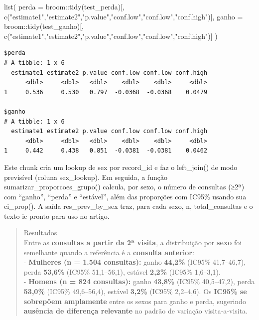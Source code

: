 \documentclass[
]{article}
\newenvironment{Shaded}{\begin{snugshade}}{\end{snugshade}}
\newcommand{\AttributeTok}[1]{\textcolor[rgb]{0.40,0.45,0.13}{#1}}
\newcommand{\FunctionTok}[1]{\textcolor[rgb]{0.28,0.35,0.67}{#1}}
\newcommand{\NormalTok}[1]{\textcolor[rgb]{0.00,0.23,0.31}{#1}}
\newcommand{\SpecialCharTok}[1]{\textcolor[rgb]{0.37,0.37,0.37}{#1}}
\newcommand{\StringTok}[1]{\textcolor[rgb]{0.13,0.47,0.30}{#1}}
\begin{document}
\begin{Shaded}
\begin{Highlighting}[]
\FunctionTok{list}\NormalTok{(}
  \AttributeTok{perda =}\NormalTok{ broom}\SpecialCharTok{::}\FunctionTok{tidy}\NormalTok{(test\_perda)[, }\FunctionTok{c}\NormalTok{(}\StringTok{"estimate1"}\NormalTok{,}\StringTok{"estimate2"}\NormalTok{,}\StringTok{"p.value"}\NormalTok{,}\StringTok{"conf.low"}\NormalTok{,}\StringTok{"conf.low"}\NormalTok{,}\StringTok{"conf.high"}\NormalTok{)],}
  \AttributeTok{ganho =}\NormalTok{ broom}\SpecialCharTok{::}\FunctionTok{tidy}\NormalTok{(test\_ganho)[, }\FunctionTok{c}\NormalTok{(}\StringTok{"estimate1"}\NormalTok{,}\StringTok{"estimate2"}\NormalTok{,}\StringTok{"p.value"}\NormalTok{,}\StringTok{"conf.low"}\NormalTok{,}\StringTok{"conf.low"}\NormalTok{,}\StringTok{"conf.high"}\NormalTok{)]}
\NormalTok{)}
\end{Highlighting}
\end{Shaded}

\begin{verbatim}
$perda
# A tibble: 1 x 6
  estimate1 estimate2 p.value conf.low conf.low conf.high
      <dbl>     <dbl>   <dbl>    <dbl>    <dbl>     <dbl>
1     0.536     0.530   0.797  -0.0368  -0.0368    0.0479

$ganho
# A tibble: 1 x 6
  estimate1 estimate2 p.value conf.low conf.low conf.high
      <dbl>     <dbl>   <dbl>    <dbl>    <dbl>     <dbl>
1     0.442     0.438   0.851  -0.0381  -0.0381    0.0462
\end{verbatim}

Este chunk cria um lookup de sex por record\_id e faz o left\_join() de
modo previsível (coluna sex\_lookup). Em seguida, a função
sumarizar\_proporcoes\_grupo() calcula, por sexo, o número de consultas
(≥2ª) com ``ganho'', ``perda'' e ``estável'', além das proporções com
IC95\% usando sua ci\_prop(). A saída res\_prev\_by\_sex traz, para cada
sexo, n, total\_consultas e o texto ic pronto para uso no artigo.

\begin{quote}
Resultados\\
Entre as \textbf{consultas a partir da 2ª visita}, a distribuição por
\textbf{sexo} foi semelhante quando a referência é a \textbf{consulta
anterior}:\\
- \textbf{Mulheres (n = 1.504 consultas):} ganho \textbf{44,2\%} (IC95\%
41,7--46,7), perda \textbf{53,6\%} (IC95\% 51,1--56,1), estável
\textbf{2,2\%} (IC95\% 1,6--3,1).\\
- \textbf{Homens (n = 824 consultas):} ganho \textbf{43,8\%} (IC95\%
40,5--47,2), perda \textbf{53,0\%} (IC95\% 49,6--56,4), estável
\textbf{3,2\%} (IC95\% 2,2--4,6). Os \textbf{IC95\% se sobrepõem
amplamente} entre os sexos para ganho e perda, sugerindo
\textbf{ausência de diferença relevante} no padrão de variação
visita‑a‑visita.\\
\end{quote}
\end{document}
